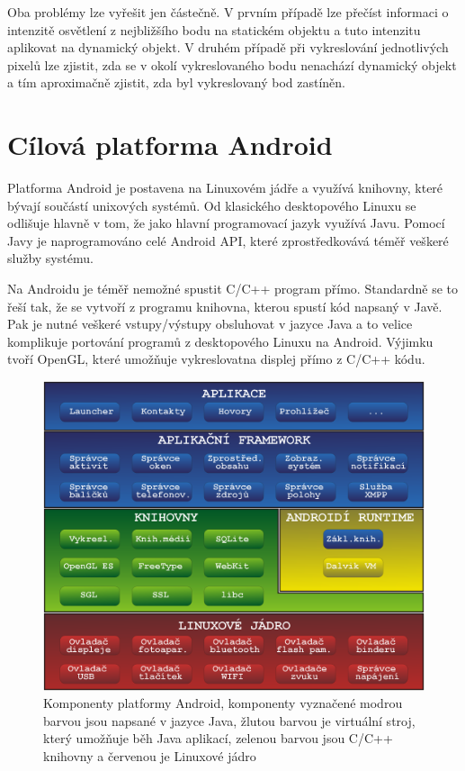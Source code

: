 \documentclass[11pt,twoside,a4paper]{book}
\begin{document}
Oba problémy lze vyřešit jen částečně. V prvním případě lze přečíst informaci o intenzitě osvětlení z nejbližšího bodu na statickém objektu a tuto intenzitu aplikovat na dynamický objekt. V druhém případě při vykreslování jednotlivých pixelů lze zjistit, zda se v okolí vykreslovaného bodu nenachází dynamický objekt a tím aproximačně zjistit, zda byl vykreslovaný bod zastíněn.
\newpage

\section{Cílová platforma Android}
Platforma Android je postavena na Linuxovém jádře a využívá knihovny, které bývají součástí unixových systémů. Od klasického desktopového Linuxu se odlišuje hlavně v tom, že jako hlavní programovací jazyk využívá Javu. Pomocí Javy je naprogramováno celé Android API, které zprostředkovává téměř veškeré služby systému.

Na Androidu je téměř nemožné spustit C/C++ program přímo. Standardně se to řeší tak, že se vytvoří z programu knihovna, kterou spustí kód napsaný v Javě. Pak je nutné veškeré vstupy/výstupy obsluhovat v jazyce Java a to velice komplikuje portování programů z desktopového Linuxu na Android. Výjimku tvoří OpenGL, které umožňuje vykreslovat\linebreak na displej přímo z C/C++ kódu.

\begin{center}
\begin{figure}[h!]
\includegraphics[width=120mm]{figures/android.png}
\caption{Komponenty platformy Android, komponenty vyznačené modrou barvou jsou napsané v jazyce Java, žlutou barvou je virtuální stroj, který umožňuje běh Java aplikací, zelenou barvou jsou C/C++ knihovny a červenou je Linuxové jádro}
\end{figure}
\end{center}
\end{document}
